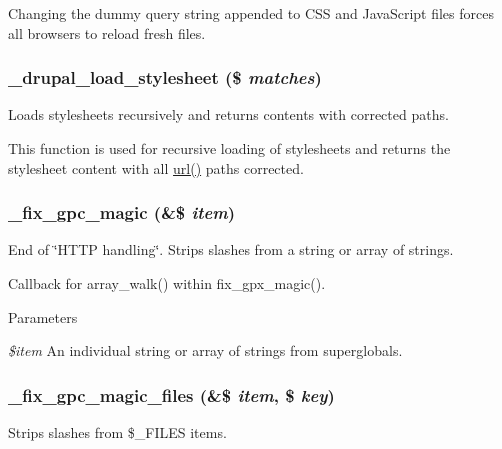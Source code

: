 Changing the dummy query string appended to CSS and JavaScript files forces all browsers to reload fresh files. \hypertarget{common_8inc_a79a5c2b6f50963f2e185b6c34d6bd10e}{
\subsubsection[{\_\-drupal\_\-load\_\-stylesheet}]{\setlength{\rightskip}{0pt plus 5cm}\_\-drupal\_\-load\_\-stylesheet (\$ {\em matches})}}
\label{common_8inc_a79a5c2b6f50963f2e185b6c34d6bd10e}
Loads stylesheets recursively and returns contents with corrected paths.

This function is used for recursive loading of stylesheets and returns the stylesheet content with all \hyperlink{common_8inc_a43b2a0594431556db49df980801d8807}{url()} paths corrected. \hypertarget{common_8inc_a4060ad61de80e6b8931ce8ad3c3aaebc}{
\subsubsection[{\_\-fix\_\-gpc\_\-magic}]{\setlength{\rightskip}{0pt plus 5cm}\_\-fix\_\-gpc\_\-magic (\&\$ {\em item})}}
\label{common_8inc_a4060ad61de80e6b8931ce8ad3c3aaebc}
End of \char`\"{}HTTP handling\char`\"{}. Strips slashes from a string or array of strings.

Callback for array\_\-walk() within fix\_\-gpx\_\-magic().


\begin{DoxyParams}{Parameters}
\item[{\em \$item}]An individual string or array of strings from superglobals. \end{DoxyParams}
\hypertarget{common_8inc_aca820a7438df9d2244148e4b8895291e}{
\subsubsection[{\_\-fix\_\-gpc\_\-magic\_\-files}]{\setlength{\rightskip}{0pt plus 5cm}\_\-fix\_\-gpc\_\-magic\_\-files (\&\$ {\em item}, \/  \$ {\em key})}}
\label{common_8inc_aca820a7438df9d2244148e4b8895291e}
Strips slashes from \$\_\-FILES items.

